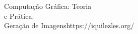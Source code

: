 \documentclass[preview]{standalone}
\begin{document}
Computação Gráfica: Teoria\\e Prática:\\Geração de Imagenshttps://iquilezles.org/\\
\end{document}
